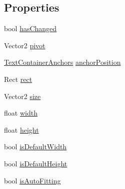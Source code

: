 \subsection*{Properties}
\begin{DoxyCompactItemize}
\item 
bool \mbox{\hyperlink{class_t_m_pro_1_1_text_container_a7cbb20fc72021b61df7c0319aa5866dc}{has\+Changed}}
\item 
Vector2 \mbox{\hyperlink{class_t_m_pro_1_1_text_container_a5f8a7573285c467436e353d4ce4fcc97}{pivot}}
\item 
\mbox{\hyperlink{namespace_t_m_pro_a19b6f6ab9f030ef024cf96f3c9e86d8f}{Text\+Container\+Anchors}} \mbox{\hyperlink{class_t_m_pro_1_1_text_container_ac1d17c9ad6d688b3c98fc2ba7b8287c7}{anchor\+Position}}
\item 
Rect \mbox{\hyperlink{class_t_m_pro_1_1_text_container_aacf513ed7ab8a3cf632d82ad0d63400c}{rect}}
\item 
Vector2 \mbox{\hyperlink{class_t_m_pro_1_1_text_container_ab7c1f9a10459119c77932e9f80831ab2}{size}}
\item 
float \mbox{\hyperlink{class_t_m_pro_1_1_text_container_ad34dc6173b6b49c311027c2513d23be5}{width}}
\item 
float \mbox{\hyperlink{class_t_m_pro_1_1_text_container_a87342175a8432ab618152b99f1df290c}{height}}
\item 
bool \mbox{\hyperlink{class_t_m_pro_1_1_text_container_af19ef280ecc922d0a1f6de6b2e8c7ba8}{is\+Default\+Width}}
\item 
bool \mbox{\hyperlink{class_t_m_pro_1_1_text_container_ab380cad11eaca7f32864f461998f0291}{is\+Default\+Height}}
\item 
bool \mbox{\hyperlink{class_t_m_pro_1_1_text_container_abde83f8527051567db483e6821e2de9c}{is\+Auto\+Fitting}}

\end{DoxyCompactItemize}
